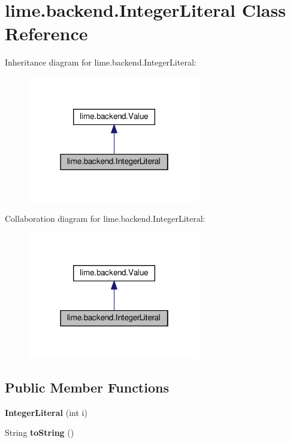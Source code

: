 \hypertarget{classlime_1_1backend_1_1IntegerLiteral}{}\section{lime.\+backend.\+Integer\+Literal Class Reference}
\label{classlime_1_1backend_1_1IntegerLiteral}


Inheritance diagram for lime.\+backend.\+Integer\+Literal\+:
\nopagebreak
\begin{figure}[H]
\begin{center}
\leavevmode
\includegraphics[width=214pt]{classlime_1_1backend_1_1IntegerLiteral__inherit__graph}
\end{center}
\end{figure}


Collaboration diagram for lime.\+backend.\+Integer\+Literal\+:
\nopagebreak
\begin{figure}[H]
\begin{center}
\leavevmode
\includegraphics[width=214pt]{classlime_1_1backend_1_1IntegerLiteral__coll__graph}
\end{center}
\end{figure}
\subsection*{Public Member Functions}
\begin{DoxyCompactItemize}
\item 
\mbox{\label{classlime_1_1backend_1_1IntegerLiteral_a1551d0bf66c6f0eb2a1508f1083ab752}} 
{\bfseries Integer\+Literal} (int i)
\item 
\mbox{\label{classlime_1_1backend_1_1IntegerLiteral_a4a27afb9a39d6bacde2a15641d38471b}} 
String {\bfseries to\+String} ()
\end{DoxyCompactItemize}
